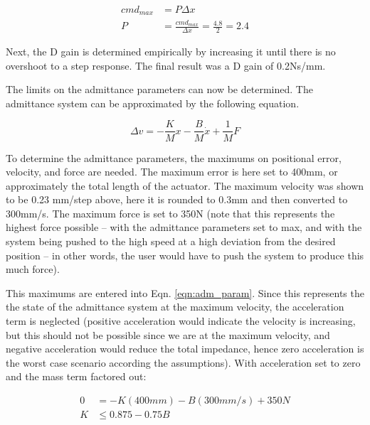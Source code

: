 \documentclass[12pt]{report}
\begin{document}
	\begin{align*}
		cmd_{max} &= P\Delta x \\
		P &= \frac{cmd_{max}}{\Delta x} = \frac{4.8}{2} =  2.4
	\end{align*}
	
	Next, the D gain is determined empirically by increasing it until there is no overshoot to a step response. The final result was a D gain of 0.2Ns/mm. 
	
	The limits on the admittance parameters can now be determined. The admittance system can be approximated by the following equation. 
	
	\begin{equation} \label{eqn:adm_param}
		\Delta v = - \frac{K}{M}x - \frac{B}{M}\dot{x} + \frac{1}{M}F
	\end{equation}
	
	
	To determine the admittance parameters, the maximums on positional error, velocity, and force are needed. The maximum error is here set to 400mm, or approximately the total length of the actuator. The maximum velocity was shown to be 0.23 mm/step above, here it is rounded to 0.3mm and then converted to 300mm/s. The maximum force is set to 350N (note that this represents the highest force possible -- with the admittance parameters set to max, and with the system being pushed to the high speed at a high deviation from the desired position -- in other words, the user would have to push the system to produce this much force). 
	
	This maximums are entered into Eqn. \ref{eqn:adm_param}. Since this represents the the state of the admittance system at the maximum velocity, the acceleration term is neglected (positive acceleration would indicate the velocity is increasing, but this should not be possible since we are at the maximum velocity, and negative acceleration would reduce the total impedance, hence zero acceleration is the worst case scenario according the assumptions). With acceleration set to zero and the mass term factored out:
	
	\begin{align}
		0 &= -K(400mm) - B(300mm/s) + 350N \\
		K &\leq 0.875 - 0.75B  
	\end{align}
	
\end{document}
